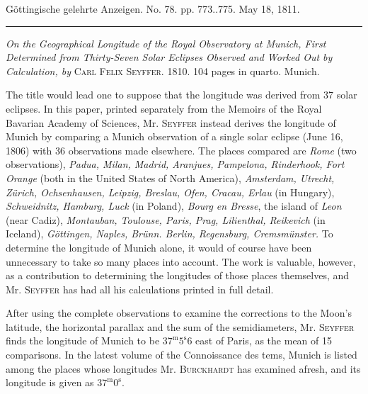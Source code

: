 \hypertarget{native-538Seyffer}{}\label{native-538Seyffer}
\begin{center}\small Göttingische gelehrte Anzeigen. No. 78. pp. 773..775. May 18, 1811.\\[3pt]\rule{.72\linewidth}{.3pt}\end{center}

\emph{On the Geographical Longitude of the Royal Observatory at Munich, First Determined from Thirty-Seven Solar Eclipses Observed and Worked Out by Calculation, by} \textsc{Carl Felix Seyffer}. 1810. 104 pages in quarto. Munich.

The title would lead one to suppose that the longitude was derived from 37 solar eclipses. In this paper, printed separately from the Memoirs of the Royal Bavarian Academy of Sciences, Mr. \textsc{Seyffer} instead derives the longitude of Munich by comparing a Munich observation of a single solar eclipse (June 16, 1806) with 36 observations made elsewhere. The places compared are \emph{Rome} (two observations), \emph{Padua, Milan, Madrid, Aranjues, Pampelona, Rinderhook, Fort Orange} (both in the United States of North America), \emph{Amsterdam, Utrecht,} \emph{Zürich, Ochsenhausen, Leipzig, Breslau, Ofen, Cracau, Erlau} (in Hungary), \emph{Schweidnitz, Hamburg, Luck} (in Poland), \emph{Bourg en Bresse}, the island of \emph{Leon} (near Cadiz), \emph{Montauban, Toulouse, Paris, Prag, Lilienthal, Reikevich} (in Iceland), \emph{Göttingen, Naples, Brünn. Berlin, Regensburg, Cremsmünster.} To determine the longitude of Munich alone, it would of course have been unnecessary to take so many places into account. The work is valuable, however, as a contribution to determining the longitudes of those places themselves, and Mr. \textsc{Seyffer} has had all his calculations printed in full detail.

After using the complete observations to examine the corrections to the Moon's latitude, the horizontal parallax and the sum of the semidiameters, Mr. \textsc{Seyffer} finds the longitude of Munich to be $37^{\mathrm m}5^{\mathrm s}6$ east of Paris, as the mean of 15 comparisons. In the latest volume of the Connoissance des tems, Munich is listed among the places whose longitudes Mr. \textsc{Burckhardt} has examined afresh, and its longitude is given as $37^{\mathrm m}0^{\mathrm s}$.
